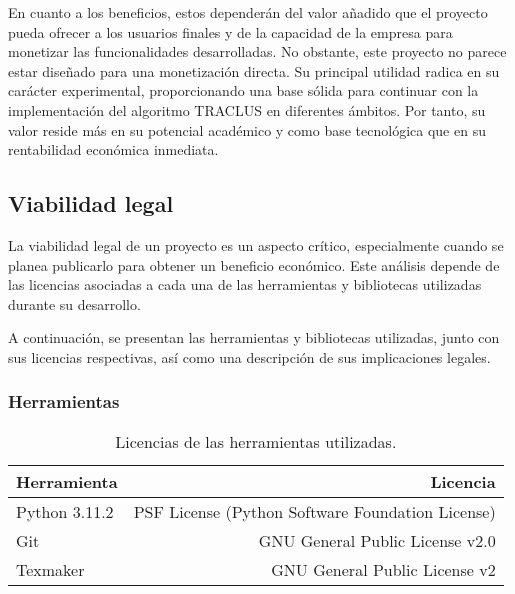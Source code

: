 En cuanto a los beneficios, estos dependerán del valor añadido que el proyecto pueda ofrecer a los usuarios finales y de la capacidad de la empresa para monetizar las funcionalidades desarrolladas. No obstante, este proyecto no parece estar diseñado para una monetización directa. Su principal utilidad radica en su carácter experimental, proporcionando una base sólida para continuar con la implementación del algoritmo TRACLUS en diferentes ámbitos. Por tanto, su valor reside más en su potencial académico y como base tecnológica que en su rentabilidad económica inmediata.

\subsection{Viabilidad legal}

La viabilidad legal de un proyecto es un aspecto crítico, especialmente cuando se planea publicarlo para obtener un beneficio económico. Este análisis depende de las licencias asociadas a cada una de las herramientas y bibliotecas utilizadas durante su desarrollo.

A continuación, se presentan las herramientas y bibliotecas utilizadas, junto con sus licencias respectivas, así como una descripción de sus implicaciones legales.

\subsubsection{Herramientas}

\begin{table}[H]
\centering
\begin{tabular}{lr}
\toprule
Herramienta & Licencia \\ 
\midrule
Python 3.11.2 & PSF License (Python Software Foundation License) \\ 
Git & GNU General Public License v2.0 \\ 
Texmaker & GNU General Public License v2 \\ 
\bottomrule
\end{tabular}
\caption{Licencias de las herramientas utilizadas.}
\end{table}

